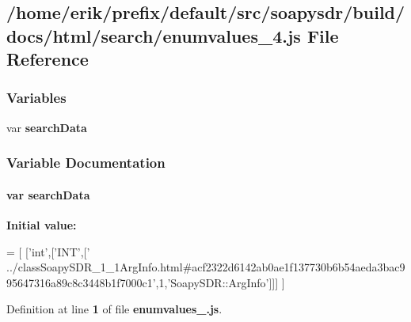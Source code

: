 \subsection{/home/erik/prefix/default/src/soapysdr/build/docs/html/search/enumvalues\+\_\+4.js File Reference}
\label{enumvalues__4_8js}
\subsubsection*{Variables}
\begin{DoxyCompactItemize}
\item 
var {\bf search\+Data}
\end{DoxyCompactItemize}


\subsubsection{Variable Documentation}
\paragraph[{search\+Data}]{\setlength{\rightskip}{0pt plus 5cm}var search\+Data}\label{enumvalues__4_8js_ad01a7523f103d6242ef9b0451861231e}
{\bfseries Initial value\+:}
\begin{DoxyCode}
=
[
  [\textcolor{stringliteral}{'int'},[\textcolor{stringliteral}{'INT'},[\textcolor{stringliteral}{'
      ../classSoapySDR\_1\_1ArgInfo.html#acf2322d6142ab0ae1f137730b6b54aeda3bac995647316a89c8c3448b1f7000c1'},1,\textcolor{stringliteral}{'SoapySDR::ArgInfo'}]]]
]
\end{DoxyCode}


Definition at line {\bf 1} of file {\bf enumvalues\+\_.\+js}.

